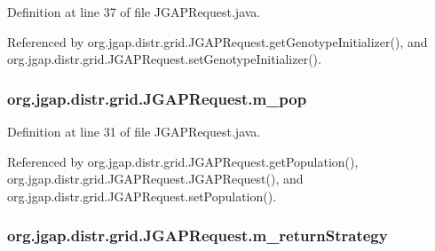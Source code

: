 Definition at line 37 of file J\-G\-A\-P\-Request.\-java.



Referenced by org.\-jgap.\-distr.\-grid.\-J\-G\-A\-P\-Request.\-get\-Genotype\-Initializer(), and org.\-jgap.\-distr.\-grid.\-J\-G\-A\-P\-Request.\-set\-Genotype\-Initializer().

\hypertarget{classorg_1_1jgap_1_1distr_1_1grid_1_1_j_g_a_p_request_a77102f568d8057fc264cc2ca9dc7c6ea}{
\subsubsection[{m\-\_\-pop}]{ org.\-jgap.\-distr.\-grid.\-J\-G\-A\-P\-Request.\-m\-\_\-pop\hspace{0.3cm}{\ttfamily [private]}}}\label{classorg_1_1jgap_1_1distr_1_1grid_1_1_j_g_a_p_request_a77102f568d8057fc264cc2ca9dc7c6ea}


Definition at line 31 of file J\-G\-A\-P\-Request.\-java.



Referenced by org.\-jgap.\-distr.\-grid.\-J\-G\-A\-P\-Request.\-get\-Population(), org.\-jgap.\-distr.\-grid.\-J\-G\-A\-P\-Request.\-J\-G\-A\-P\-Request(), and org.\-jgap.\-distr.\-grid.\-J\-G\-A\-P\-Request.\-set\-Population().

\hypertarget{classorg_1_1jgap_1_1distr_1_1grid_1_1_j_g_a_p_request_a957e295de2a8089f99a23667a5ae8d41}{
\subsubsection[{m\-\_\-return\-Strategy}]{ org.\-jgap.\-distr.\-grid.\-J\-G\-A\-P\-Request.\-m\-\_\-return\-Strategy\hspace{0.3cm}{\ttfamily [private]}}}\label{classorg_1_1jgap_1_1distr_1_1grid_1_1_j_g_a_p_request_a957e295de2a8089f99a23667a5ae8d41}


